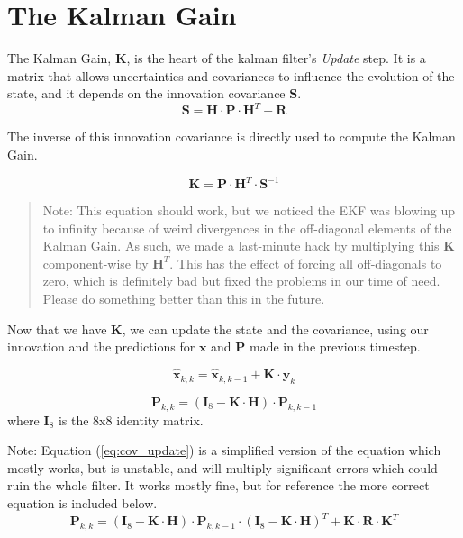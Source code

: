 \section{The Kalman Gain}

The Kalman Gain, $\boldsymbol{K}$, is the heart of the kalman filter's \textit{Update} step. It is a matrix that allows uncertainties and covariances to influence the evolution of the state, and it depends on the innovation covariance $\boldsymbol{S}$.
\begin{equation}
    \boldsymbol{S} = \boldsymbol{H} \cdot \boldsymbol{P} \cdot \boldsymbol{H}^T + \boldsymbol{R}
\end{equation}

The inverse of this innovation covariance is directly used to compute the Kalman Gain.

\begin{equation}
    \boldsymbol{K} = \boldsymbol{P} \cdot \boldsymbol{H}^T \cdot \boldsymbol{S}^{-1}
\end{equation}

\begin{quote}
    Note: This equation should work, but we noticed the EKF was blowing up to infinity because of weird divergences in the off-diagonal elements of the Kalman Gain. As such, we made a last-minute hack by multiplying this $\boldsymbol{K}$ component-wise by $\boldsymbol{H}^T$. This has the effect of forcing all off-diagonals to zero, which is definitely bad but fixed the problems in our time of need. Please do something better than this in the future.
\end{quote}

Now that we have $\boldsymbol{K}$, we can update the state and the covariance, using our innovation and the predictions for $\boldsymbol{x}$ and $\boldsymbol{P}$ made in the previous timestep.

\begin{equation}
    \boldsymbol{\hat{x}}_{k,k} = \boldsymbol{\hat{x}}_{k,k-1} + \boldsymbol{K} \cdot \boldsymbol{y}_k
\end{equation}

\begin{equation}
    \boldsymbol{P}_{k,k} = (\boldsymbol{I}_8 - \boldsymbol{K} \cdot \boldsymbol{H}) \cdot \boldsymbol{P}_{k,k-1}
    \label{eq:cov_update}
\end{equation}
where $\boldsymbol{I}_8$ is the 8x8 identity matrix.
    
Note: Equation (\ref{eq:cov_update}) is a simplified version of the equation which mostly works, but is unstable, and will multiply significant errors which could ruin the whole filter. It works mostly fine, but for reference the more correct equation is included below.
\begin{equation}
    \boldsymbol{P}_{k,k} = (\boldsymbol{I}_8 - \boldsymbol{K} \cdot \boldsymbol{H}) \cdot \boldsymbol{P}_{k,k-1}
    \cdot (\boldsymbol{I}_8 - \boldsymbol{K} \cdot \boldsymbol{H})^T + 
    \boldsymbol{K} \cdot \boldsymbol{R} \cdot \boldsymbol{K}^T
\end{equation}

